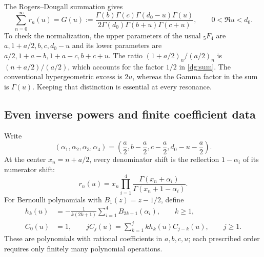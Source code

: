 \documentclass[11pt,a4paper]{article}
\numberwithin{equation}{section}
\theoremstyle{definition}
\theoremstyle{remark}
\begin{document}
The Rogers--Dougall summation \cite[Eq.~16.4.9]{dlmf-hyper} gives
\begin{equation}\label{dg:sum}
 \sum_{n=0}^{\infty}r_n(u)=G(u):=
 \frac{\Gamma(b)\Gamma(c)\Gamma(d_0-u)\Gamma(u)}
 {2\Gamma(d_0)\Gamma(b+u)\Gamma(c+u)},
 \qquad 0<\Re u<d_0.
\end{equation}
To check the normalization, the upper parameters of the usual
${}_5F_4$ are $a,1+a/2,b,c,d_0-u$ and its lower parameters are
$a/2,1+a-b,1+a-c,b+c+u$. The ratio
$(1+a/2)_n/(a/2)_n$ is $(n+a/2)/(a/2)$, which accounts for the
factor $1/2$ in \eqref{dg:sum}. The conventional hypergeometric excess
is $2u$, whereas the Gamma factor in the sum is $\Gamma(u)$.
Keeping that distinction is essential at every resonance.

\subsection{Even inverse powers and finite coefficient data}
Write
\begin{equation}\label{dg:alpha}
 (\alpha_1,\alpha_2,\alpha_3,\alpha_4)
 =\left(\frac a2,b-\frac a2,c-\frac a2,d_0-u-\frac a2\right).
\end{equation}
At the center $x_n=n+a/2$, every denominator shift is the reflection
$1-\alpha_i$ of its numerator shift:
\[
 r_n(u)=x_n\prod_{i=1}^4
       \frac{\Gamma(x_n+\alpha_i)}{\Gamma(x_n+1-\alpha_i)}.
\]
For Bernoulli polynomials with $B_1(z)=z-1/2$, define
\begin{align}
 h_k(u)&=-\frac{1}{k(2k+1)}
                \sum_{i=1}^4B_{2k+1}(\alpha_i),\qquad k\ge1,
                  \label{dg:hk}\\
 C_0(u)&=1,\qquad
 jC_j(u)=\sum_{k=1}^j k h_k(u)C_{j-k}(u),\qquad j\ge1.
                  \label{dg:recurrence}
\end{align}
These are polynomials with rational coefficients in $a,b,c,u$; each
prescribed order requires only finitely many polynomial operations.
\end{document}
